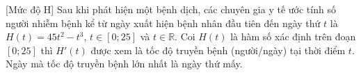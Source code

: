 \begin{bt}%
[Mức độ H]
	Sau khi phát hiện một bệnh dịch, các chuyên gia y tế ước tính số người nhiễm bệnh kể từ ngày xuất hiện bệnh nhân đầu tiên đến ngày thứ $t$ là $H(t)=45t^2-t^3\text{, }t \in [0;25]$ và $t\in \mathbb{R}$. Coi $H(t)$ là hàm số xác định trên đoạn $[0;25]$ thì $H'(t)$ được xem là tốc độ truyền bệnh (người/ngày) tại thời điểm $t$. Ngày mà tốc độ truyền bệnh lớn nhất là ngày thứ mấy.
\end{bt}

